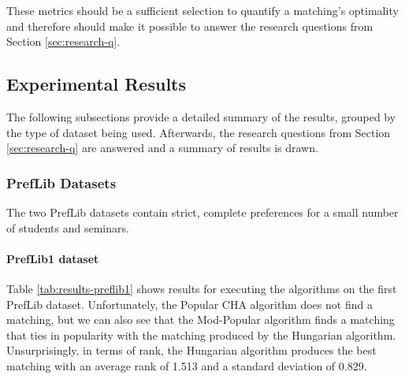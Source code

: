 These metrics should be a sufficient selection to quantify a matching's optimality and therefore should make it possible to answer the research questions from Section \ref{sec:research-q}.

\subsection{Experimental Results}
The following subsections provide a detailed summary of the results, grouped by the type of dataset being used. Afterwards, the research questions from Section \ref{sec:research-q} are answered and a summary of results is drawn.

\subsubsection{PrefLib Datasets}
The two PrefLib datasets contain strict, complete preferences for a small number of students and seminars.

\paragraph{PrefLib1 dataset}
Table \ref{tab:results-preflib1} shows results for executing the algorithms on the first PrefLib dataset. Unfortunately, the Popular CHA algorithm does not find a matching, but we can also see that the Mod-Popular algorithm finds a matching that ties in popularity with the matching produced by the Hungarian algorithm. Unsurprisingly, in terms of rank, the Hungarian algorithm produces the best matching with an average rank of 1.513 and a standard deviation of 0.829.

\begin{table}[h!]
  \centering
  \caption{Summary of the results for PrefLib1}
  \label{tab:results-preflib1}
\end{table}

